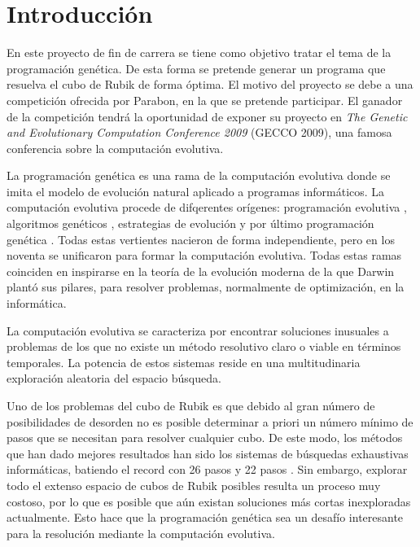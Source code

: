 %
\chapter{Introducción}\label{ch:intro}

En este proyecto de fin de carrera se tiene como objetivo tratar el tema de la
programación genética. De esta forma se pretende generar un programa que resuelva
el cubo de Rubik de forma óptima. El motivo del proyecto se debe a una
competición ofrecida por Parabon, en la que se pretende participar. El ganador
de la competición tendrá la oportunidad de exponer su proyecto en \textit{The
Genetic and Evolutionary Computation Conference 2009} (GECCO 2009),
una famosa conferencia sobre la computación evolutiva.

La programación genética es una rama de la computación evolutiva donde se imita
el modelo de evolución natural aplicado a programas informáticos. La computación
evolutiva procede de difqerentes orígenes: programación evolutiva
\cite{Fogel:1966}, algoritmos genéticos \cite{Holland:1975}, estrategias de
evolución \cite{Rechenberg:1971,Schwefel:1975} y por último programación genética
\cite{Cramer:1985,Koza:1992}. Todas estas vertientes nacieron de forma
independiente, pero en los noventa se unificaron para formar la computación
evolutiva.  Todas estas ramas coinciden en inspirarse en la teoría de la
evolución moderna de la que Darwin \cite{Darwin:1859} plantó sus pilares, para
resolver problemas, normalmente de optimización, en la informática.

La computación evolutiva se caracteriza por encontrar soluciones inusuales a
problemas de los que no existe un método resolutivo claro o viable en términos
temporales. La potencia de estos sistemas reside en una multitudinaria
exploración aleatoria del espacio búsqueda.

Uno de los problemas del cubo de Rubik es que debido al gran número de
posibilidades de desorden no es posible determinar a priori un número mínimo de
pasos que se necesitan para resolver cualquier cubo. De este modo, los métodos
que han dado mejores resultados han sido los sistemas de búsquedas exhaustivas
informáticas,  batiendo el record con 26 pasos \cite{Cooperman-Kunkle:2007} y
22 pasos \cite{Rokicki:2008}. Sin embargo, explorar todo el extenso espacio de
cubos de Rubik posibles resulta un proceso muy costoso, por lo que es posible que
aún existan soluciones más cortas inexploradas actualmente. Esto hace que la
programación genética sea un desafío interesante para la resolución mediante la
computación evolutiva.

